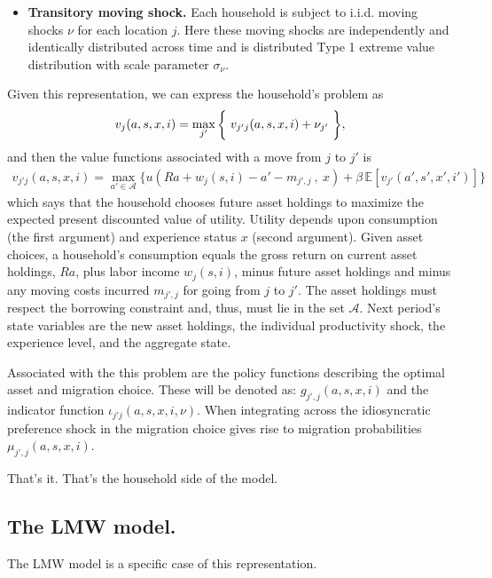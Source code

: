 \documentclass[12pt,pdftex]{article}
\begin{document}
\begin{onehalfspacing}
\begin{itemize}
\item \textbf{Transitory moving shock.} Each household is subject to i.i.d. moving shocks $\nu$ for each location $j$. Here these moving shocks are independently and identically distributed across time and is distributed Type 1 extreme value distribution with scale parameter $\sigma_{\nu}$.
\end{itemize}
Given this representation, we can express the household's problem as
\begin{align}
\small
v_j(a, s, x, i) = \max_{j'} \bigg\{ \ v_{j'j}(a, s, x, i) + \nu_{j'} \ \bigg \},
\label{eq:value_fun}
\end{align}
and then the value functions associated with a move from $j$ to $j'$ is
\begin{align}
v_{j'j}(a, s, x, i) = \max_{a'\in \mathcal{A}}\bigg  \{ u(Ra + w_{j}(s, i) - a' - m_{j',j} \ , \  x)  + \beta \, \mathbb{E} [v_{j'}(a', s', x', i')]  \bigg\}
\label{eq:value_fun_locaiton}
\end{align}
which says that the household chooses future asset holdings to maximize the expected present discounted value of utility.  Utility depends upon consumption (the first argument) and experience status $x$ (second argument).  Given asset choices, a household's consumption equals the gross return on current asset holdings, $Ra$, plus labor income $w_{j}(s, i)$, minus future asset holdings and minus any moving costs incurred $m_{j',j}$ for going from $j$ to $j'$. The asset holdings must respect the borrowing constraint and, thus, must lie in the set $\mathcal{A}$. Next period's state variables are the new asset holdings, the individual productivity shock, the experience level, and the aggregate state.

Associated with the this problem are the policy functions describing the optimal asset and migration choice. These will be denoted as: $g_{j',j}(a, s, x, i)$ and the indicator function $\iota_{j'j}(a, s, x, i, \nu)$. When integrating across the idiosyncratic preference shock in the migration choice gives rise to migration probabilities $\mu_{j',j}(a, s, x, i)$.

That's it. That's the household side of the model.

\subsection{The LMW model.}

The LMW model is a specific case of this representation.


\end{onehalfspacing}
\end{document}
